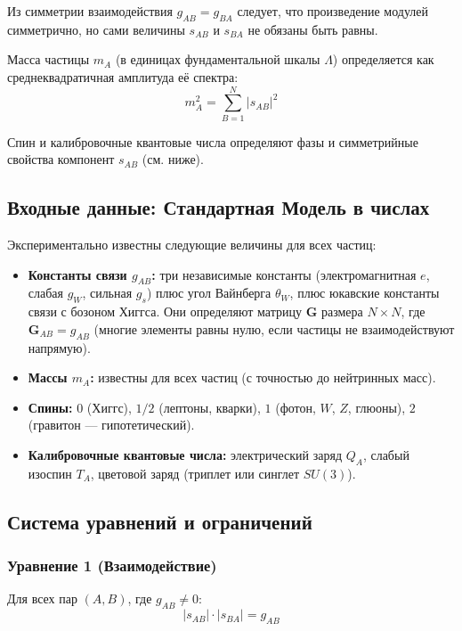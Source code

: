 \documentclass[12pt,a4paper]{article}
\begin{document}
Из симметрии взаимодействия $g_{AB} = g_{BA}$ следует, что произведение модулей симметрично, но сами величины $s_{AB}$ и $s_{BA}$ не обязаны быть равны.

Масса частицы $m_A$ (в единицах фундаментальной шкалы $\Lambda$) определяется как среднеквадратичная амплитуда её спектра:
\begin{equation}
    m_A^2 = \sum_{B=1}^{N} |s_{AB}|^2
\end{equation}

Спин и калибровочные квантовые числа определяют фазы и симметрийные свойства компонент $s_{AB}$ (см. ниже).

\subsection{Входные данные: Стандартная Модель в числах}
Экспериментально известны следующие величины для всех частиц:

\begin{itemize}
    \item \textbf{Константы связи $g_{AB}$:} три независимые константы (электромагнитная $e$, слабая $g_W$, сильная $g_s$) плюс угол Вайнберга $\theta_W$, плюс юкавские константы связи с бозоном Хиггса. Они определяют матрицу $\mathbf{G}$ размера $N \times N$, где $\mathbf{G}_{AB} = g_{AB}$ (многие элементы равны нулю, если частицы не взаимодействуют напрямую).
    \item \textbf{Массы $m_A$:} известны для всех частиц (с точностью до нейтринных масс).
    \item \textbf{Спины:} $0$ (Хиггс), $1/2$ (лептоны, кварки), $1$ (фотон, $W$, $Z$, глюоны), $2$ (гравитон --- гипотетический).
    \item \textbf{Калибровочные квантовые числа:} электрический заряд $Q_A$, слабый изоспин $T_A$, цветовой заряд (триплет или синглет $SU(3)$).
\end{itemize}

\subsection{Система уравнений и ограничений}

\subsubsection{Уравнение 1 (Взаимодействие)}
Для всех пар $(A, B)$, где $g_{AB} \neq 0$:
\begin{equation}
    |s_{AB}| \cdot |s_{BA}| = g_{AB}
\end{equation}
\end{document}
